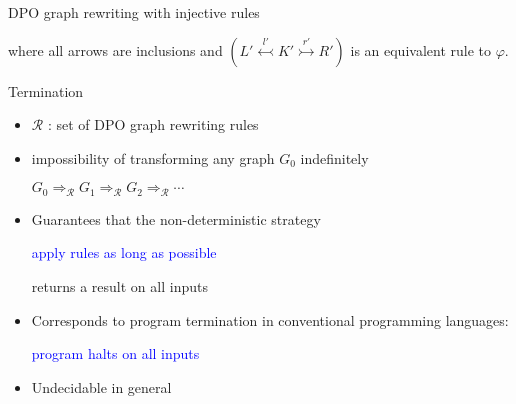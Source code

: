 \documentclass{beamer}
\newcommand{\opn}[1]{\operatorname{#1}}
\begin{document}
\begin{frame}{DPO graph rewriting with injective rules}
\begin{itemize}
\begin{center}
{
          }
      \end{center}
      where all arrows are inclusions and $(L' \overset{l'}{\leftarrowtail} K' \overset{r'}{\rightarrowtail} R')$ is an equivalent rule to $\varphi$.
 \end{itemize} 
\end{frame} 




\begin{frame}{Termination~\cite{plump2018modular}}
  \begin{itemize}
    \item $\mathcal{R}$ : set of DPO graph rewriting rules
    \item impossibility of transforming any graph $G_0$ indefinitely
      \begin{center}
        $G_0 \Rightarrow_\mathcal{R} G_1 \Rightarrow_\mathcal{R} G_2 \Rightarrow_\mathcal{R} \cdots$
      \end{center}
    \item Guarantees that the non-deterministic strategy
          \begin{center}
              \textcolor{blue}{apply rules as long as possible}
          \end{center}
          returns a result on all inputs
    \item Corresponds to program termination in conventional programming languages:
          \begin{center}
            \textcolor{blue}{program halts on all inputs}
          \end{center}
    \item Undecidable in general
  \end{itemize}
\end{frame}
\end{document}
